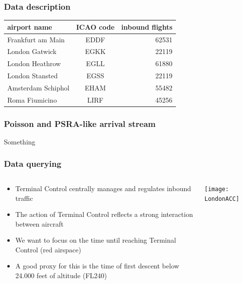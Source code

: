\documentclass[table,serif,mathserif,professionalfont,aspectratio=169]{beamer}
\begin{document}
  \begin{frame}[t]\frametitle{Data description}
    \begin{table}[tbp]
      \centering
      \vfill
      \begin{tabular}{lcr}
        \toprule
        airport name & ICAO code & inbound flights\\
        \midrule
        Frankfurt am Main  & EDDF & 62531 \\
        London Gatwick     & EGKK & 22119 \\
        London Heathrow    & EGLL & 61880 \\
        London Stansted    & EGSS & 22119 \\
        Amsterdam Schiphol & EHAM & 55482 \\
        Roma Fiumicino     & LIRF & 45256 \\
        \bottomrule
      \end{tabular}
    \end{table}
    \vfill
  \end{frame}

  \begin{frame}[t]\frametitle{Poisson and PSRA-like arrival stream}
    Something
  \end{frame}

  \begin{frame}[t]\frametitle{Data querying}
      \begin{columns}
        \begin{column}{.4\textwidth}
          \begin{itemize}
            \item Terminal Control centrally manages and regulates inbound traffic
            \item The action of Terminal Control reflects a strong interaction between aircraft
            \item We want to focus on the time until reaching Terminal Control (red airspace)
            \item A good proxy for this is the time of first descent below 24.000 feet of altitude (FL240)
          \end{itemize}
        \end{column}
        \begin{column}{.6\textwidth}
          \texttt{[image: LondonACC]}
        \end{column}
      \end{columns}
  \end{frame}
\end{document}
